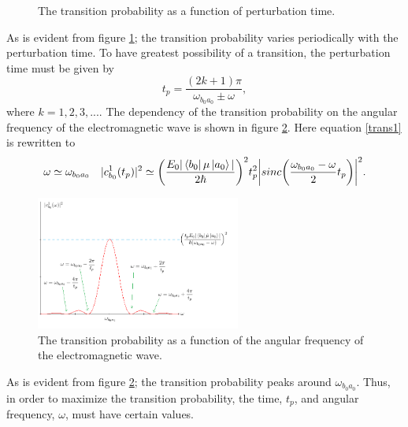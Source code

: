 \begin{example}
\begin{figure}[ht]
		\caption{The transition probability as a function of perturbation time.}
		\label{fig:pertub2}
	\end{figure}
	As is evident from figure \ref{fig:pertub2}; the transition probability varies periodically with the perturbation time. To have greatest possibility of a transition, the perturbation time must be given by
	\begin{equation}
		t_p=\frac{(2k+1)\pi}{\omega_{b_0a_0}\pm\omega},
	\end{equation} 
	where $k=1,2,3,...$. The dependency of the transition probability on the angular frequency of the electromagnetic wave is shown in figure \ref{fig:pertub3}. Here equation \eqref{trans1} is rewritten to
	\begin{equation}
		\omega\simeq\omega_{b_0a_0} \quad |c^1_{b_0}(t_p)|^2\simeq\bigg(\frac{E_0|\bra{b_0}\mu\ket{a_0}|}{2\hbar}\bigg)^2t_p^2\bigg|sinc\bigg(\frac{\omega_{b_0a_0}-\omega}{2}t_p\bigg)\bigg|^2.
	\end{equation} 
	\begin{figure}[H]
		\captionsetup{width=1\textwidth}
		\centering
		\includegraphics[width=0.6\textwidth]{figures/tipertub2}
		\caption{The transition probability as a function of the angular frequency of the electromagnetic wave.}
		\label{fig:pertub3}
	\end{figure}
	As is evident from figure \ref{fig:pertub3}; the transition probability peaks around $\omega_{b_0a_0}$. Thus, in order to maximize the transition probability, the time, $t_p$, and angular frequency, $\omega$, must have certain values.
\end{example}


